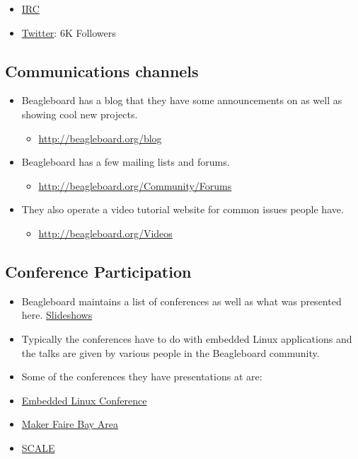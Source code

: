 \begin{itemize}
\itemsep1pt\parskip0pt
\item
  \href{http://beagleboard.org/Community/Live\%20Chat}{IRC}
\item
  \href{https://twitter.com/beagleboardorg}{Twitter}: 6K Followers
\end{itemize}

\subsection{Communications channels}\label{communications-channels}

\begin{itemize}
\itemsep1pt\parskip0pt
\item
  Beagleboard has a blog that they have some announcements on as well as
  showing cool new projects.

  \begin{itemize}
  \itemsep1pt\parskip0pt
  \item
    \url{http://beagleboard.org/blog}
  \end{itemize}
\item
  Beagleboard has a few mailing lists and forums.

  \begin{itemize}
  \itemsep1pt\parskip0pt
  \item
    \url{http://beagleboard.org/Community/Forums}
  \end{itemize}
\item
  They also operate a video tutorial website for common issues people
  have.

  \begin{itemize}
  \itemsep1pt\parskip0pt
  \item
    \url{http://beagleboard.org/Videos}
  \end{itemize}
\end{itemize}

\subsection{Conference Participation}\label{conference-participation}

\begin{itemize}
\itemsep1pt\parskip0pt
\item
  Beagleboard maintains a list of conferences as well as what was
  presented here. \href{http://beagleboard.org/show/}{Slideshows}
\item
  Typically the conferences have to do with embedded Linux applications
  and the talks are given by various people in the Beagleboard
  community.
\item
  Some of the conferences they have presentations at are:
\item
  \href{http://beagleboard.org/show/elc2015/}{Embedded Linux Conference}
\item
  \href{http://beagleboard.org/show/makerfairebayarea2015/}{Maker Faire
  Bay Area}
\item
  \href{http://beagleboard.org/show/scale2015/}{SCALE}
\end{itemize}

